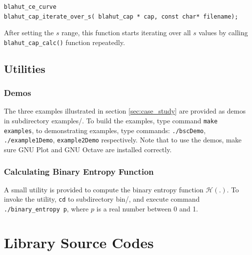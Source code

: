 \documentclass[a4paper,10pt]{article}
\begin{document}
\begin{verbatim}
blahut_ce_curve 
blahut_cap_iterate_over_s( blahut_cap * cap, const char* filename);
\end{verbatim}
After setting the $s$ range, this function starts iterating over all $s$ values by calling \verb|blahut_cap_calc()| function repeatedly.

\subsection{Utilities}
\subsubsection{Demos}
The three examples illustrated in section \ref{sec:case_study} are provided as demos in subdirectory examples/. To build the examples, type command \verb|make examples|, to demonstrating examples, type commands: \verb|./bscDemo|, \verb|./example1Demo|, \verb|example2Demo| respectively. Note that to use the demos, make sure GNU Plot and GNU Octave are installed correctly.

\subsubsection{Calculating Binary Entropy Function}
A small utility is provided to compute the binary entropy function $\mathcal{H}(.)$. To invoke the utility, \verb|cd| to subdirectory bin/, and execute command \verb|./binary_entropy p|, where $p$ is a real number between 0 and 1.

\section{Library Source Codes}
\label{sec:source}
\end{document}
